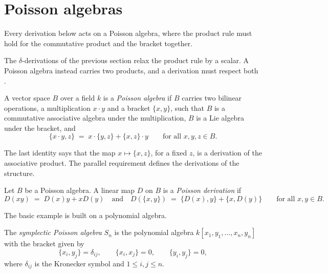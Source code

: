 \section{Poisson algebras}\label{sec:nonassociative:poisson}

Every derivation below acts on a Poisson algebra, where the product rule must hold for the commutative product and the bracket together.

The $\delta$-derivations of the previous section relax the product rule by a
scalar. %
A Poisson algebra instead carries two products, and a derivation must
respect both \cite[p.~657]{AlbertiArestiLi2018Poisson}.

\begin{definition}
\label{def:nonassociative:poisson}
A vector space $B$ over a field $k$ is a \emph{Poisson algebra} if $B$
carries two bilinear operations, a multiplication $x\cdot y$ and a bracket
$\{x,y\}$, such that $B$ is a commutative associative algebra under the
multiplication, $B$ is a Lie algebra under the bracket, and
\[
\{x\cdot y,z\}\;=\;x\cdot\{y,z\}+\{x,z\}\cdot y
\qquad\text{for all }x,y,z\in B.
\]
\end{definition}

The last identity says that the map $x\mapsto\{x,z\}$, for a fixed $z$,
is a derivation of the associative product. %
The parallel requirement defines the derivations of
the structure. %

\begin{definition}
\label{def:nonassociative:poisson-derivation}
Let $B$ be a Poisson algebra. A linear map $D$ on $B$ is a \emph{Poisson
derivation} if
\[
D(xy)\;=\;D(x)y+xD(y)
\quad\text{and}\quad
D(\{x,y\})\;=\;\{D(x),y\}+\{x,D(y)\}
\qquad\text{for all }x,y\in B.
\]
\end{definition}

The basic example is built on a polynomial algebra. %

\begin{example}
\label{ex:nonassociative:symplectic}
The \emph{symplectic Poisson algebra} $S_n$ is the polynomial algebra
$k[x_1,y_1,\dots,x_n,y_n]$ with the bracket given by
\[
\{x_i,y_j\}=\delta_{ij},\qquad \{x_i,x_j\}=0,\qquad \{y_i,y_j\}=0,
\]
where $\delta_{ij}$ is the Kronecker symbol and $1\le i,j\le n$.
\end{example}

